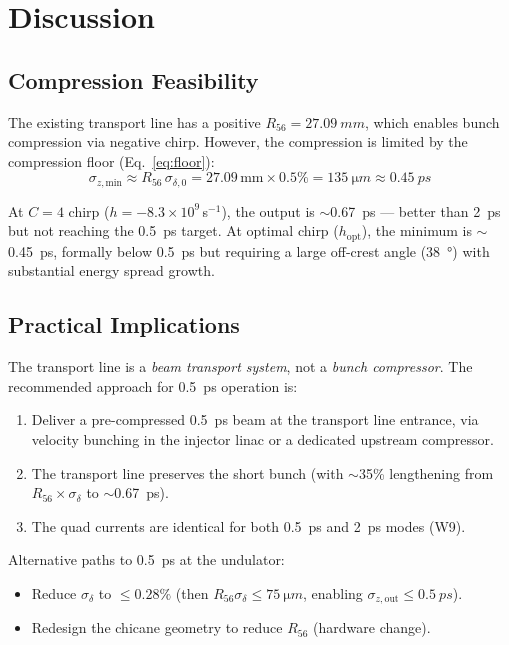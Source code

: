 \documentclass[11pt]{article}
\begin{document}
\section{Discussion}

\subsection{Compression Feasibility}

The existing transport line has a positive $R_{56} = \SI{27.09}{mm}$, which
enables bunch compression via negative chirp.  However, the compression is
limited by the compression floor (Eq.~\ref{eq:floor}):
\[
  \sigma_{z,\text{min}} \approx R_{56}\,\sigma_{\delta,0}
    = 27.09\,\text{mm} \times 0.5\% = \SI{135}{\micro m} \approx \SI{0.45}{ps}
\]

At $C = 4$ chirp ($h = -8.3\times10^9$\,s$^{-1}$), the output is
$\sim$\SI{0.67}{ps} --- better than \SI{2}{ps} but not reaching the
\SI{0.5}{ps} target.  At optimal chirp ($h_\text{opt}$), the minimum is
$\sim$\SI{0.45}{ps}, formally below \SI{0.5}{ps} but requiring a large
off-crest angle (\SI{38}{\degree}) with substantial energy spread growth.

\subsection{Practical Implications}

The transport line is a \emph{beam transport system}, not a \emph{bunch
compressor}.  The recommended approach for \SI{0.5}{ps} operation is:
\begin{enumerate}
  \item Deliver a pre-compressed \SI{0.5}{ps} beam at the transport line
    entrance, via velocity bunching in the injector linac or a dedicated
    upstream compressor.
  \item The transport line preserves the short bunch (with $\sim$35\%
    lengthening from $R_{56}\times\sigma_\delta$ to $\sim$\SI{0.67}{ps}).
  \item The quad currents are identical for both \SI{0.5}{ps} and \SI{2}{ps}
    modes (W9).
\end{enumerate}

Alternative paths to \SI{0.5}{ps} at the undulator:
\begin{itemize}
  \item Reduce $\sigma_\delta$ to $\leq 0.28\%$ (then $R_{56}\sigma_\delta
    \leq \SI{75}{\micro m}$, enabling $\sigma_{z,\text{out}} \leq \SI{0.5}{ps}$).
  \item Redesign the chicane geometry to reduce $R_{56}$ (hardware change).
\end{itemize}
\end{document}
